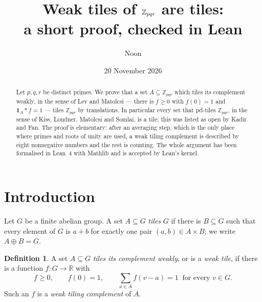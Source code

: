 \documentclass[11pt,a4paper]{amsart}
\title[Weak tiles of $\Z_{pqr}$ are tiles]{Weak tiles of $\Z_{pqr}$ are tiles:\\ a short proof, checked in Lean}
\author{Noon}
\date{20 November 2026}
\theoremstyle{definition}
\newtheorem{definition}[theorem]{Definition}
\theoremstyle{remark}
\newcommand{\Z}{\mathbb{Z}}
\newcommand{\R}{\mathbb{R}}
\newcommand{\one}{\mathbf{1}}
\begin{document}
\begin{abstract}
Let $p,q,r$ be distinct primes. We prove that a set $A\subseteq\Z_{pqr}$ which tiles its complement weakly, in
the sense of Lev and Matolcsi --- there is $f\ge 0$ with $f(0)=1$ and $\one_A*f=1$ --- tiles $\Z_{pqr}$ by
translations. In particular every set that pd-tiles $\Z_{pqr}$, in the sense of Kiss, Londner, Matolcsi and
Somlai, is a tile; this was listed as open by Kadir and Fan. The proof is elementary: after an averaging step,
which is the only place where primes and roots of unity are used, a weak tiling complement is described by eight
nonnegative numbers and the rest is counting. The whole argument has been formalised in Lean~4 with Mathlib and
is accepted by Lean's kernel.
\end{abstract}

\maketitle

\noindent{}

\section{Introduction}

Let $G$ be a finite abelian group. A set $A\subseteq G$ \emph{tiles} $G$ if there is $B\subseteq G$ such that
every element of $G$ is $a+b$ for exactly one pair $(a,b)\in A\times B$; we write $A\oplus B=G$.

\begin{definition}
A set $A\subseteq G$ \emph{tiles its complement weakly}, or is a \emph{weak tile}, if there is a function
$f\colon G\to\R$ with
\[
 f\ge 0,\qquad f(0)=1,\qquad \sum_{a\in A} f(v-a)=1\ \text{ for every } v\in G .
\]
Such an $f$ is a \emph{weak tiling complement} of $A$.
\end{definition}
\end{document}
